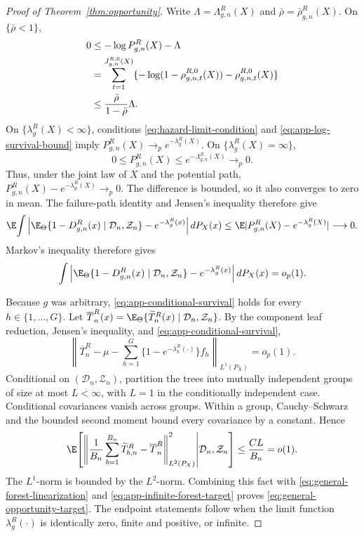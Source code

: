 \begin{appendix}
\begin{proof}[Proof of Theorem~\ref{thm:opportunity}]
Write \(\Lambda=\Lambda_{g,n}^R(X)\) and
\(\bar\rho=\bar\rho_{g,n}^R(X)\). On \(\{\bar\rho<1\}\),
\begin{align}
0
&\le -\log P_{g,n}^R(X)-\Lambda\notag\\
&=\sum_{t=1}^{J_{g,n}^{R,0}(X)}
\{-\log(1-\rho_{g,n,t}^{R,0}(X))-\rho_{g,n,t}^{R,0}(X)\}\notag\\
&\le
\frac{\bar\rho}{1-\bar\rho}\Lambda.
\label{eq:app-log-survival-bound}
\end{align}
On \(\{\lambda_g^R(X)<\infty\}\), conditions
\eqref{eq:hazard-limit-condition} and
\eqref{eq:app-log-survival-bound} imply
\(P_{g,n}^R(X)\to_p e^{-\lambda_g^R(X)}\). On
\(\{\lambda_g^R(X)=\infty\}\),
\[
0\le P_{g,n}^R(X)\le e^{-\Lambda_{g,n}^R(X)}\to_p0.
\]
Thus, under the joint law of \(X\) and the potential path,
\(P_{g,n}^R(X)-e^{-\lambda_g^R(X)}\to_p0\). The difference is bounded, so it
also converges to zero in mean. The failure-path identity and Jensen's
inequality therefore give
\[
\E\!\int\left|
\E_\Theta\{1-D_{g,n}^R(x)\mid\mathcal D_n,\mathcal Z_n\}
-e^{-\lambda_g^R(x)}
\right|dP_X(x)
\le \E|P_{g,n}^R(X)-e^{-\lambda_g^R(X)}|\longrightarrow0.
\]
Markov's inequality therefore gives
\begin{equation}\label{eq:app-conditional-survival}
\int\left|
\E_\Theta\{1-D_{g,n}^R(x)\mid\mathcal D_n,\mathcal Z_n\}
-e^{-\lambda_g^R(x)}
\right|dP_X(x)=o_p(1).
\end{equation}

Because \(g\) was arbitrary, \eqref{eq:app-conditional-survival}
holds for every \(h\in\{1,\ldots,G\}\).
Let \(\overline T_n^R(x)=
\E_\Theta\{\widetilde T_n^R(x)\mid\mathcal D_n,\mathcal Z_n\}\). By
the component leaf reduction, Jensen's inequality, and
\eqref{eq:app-conditional-survival},
\begin{equation}\label{eq:app-infinite-forest-target}
\left\|\overline T_n^R-
\mu-\sum_{h=1}^G\{1-e^{-\lambda_h^R(\cdot)}\}f_h
\right\|_{L^1(P_X)}=o_p(1).
\end{equation}
Conditional on \((\mathcal D_n,\mathcal Z_n)\), partition the trees into
mutually independent groups of size at most \(L<\infty\), with \(L=1\) in the
conditionally independent case. Conditional covariances vanish across groups.
Within a group, Cauchy--Schwarz and the bounded second moment
bound every covariance by a constant. Hence
\[
\E\!\left[
\left\|\frac1{B_n}\sum_{b=1}^{B_n}\widetilde T_{b,n}^R
-\overline T_n^R\right\|_{L^2(P_X)}^2
\middle|\mathcal D_n,\mathcal Z_n\right]\le\frac{CL}{B_n}=o(1).
\]
The \(L^1\)-norm is bounded by the \(L^2\)-norm. Combining this fact with
\eqref{eq:general-forest-linearization} and
\eqref{eq:app-infinite-forest-target} proves
\eqref{eq:general-opportunity-target}. The endpoint statements follow when the
limit function \(\lambda_g^R(\cdot)\) is identically zero, finite and positive,
or infinite.
\end{proof}


\end{appendix}
